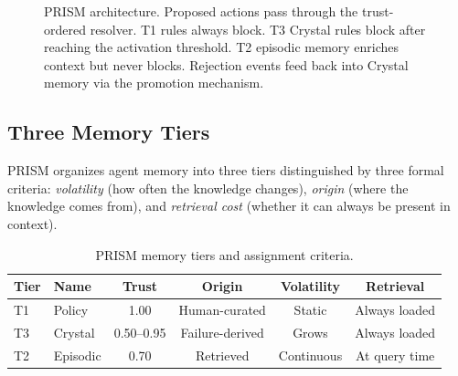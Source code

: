 \documentclass[11pt]{article}
\begin{document}
\begin{figure}[h]
\caption{PRISM architecture. Proposed actions pass through the trust-ordered resolver.
T1 rules always block. T3 Crystal rules block after reaching the activation threshold.
T2 episodic memory enriches context but never blocks.
Rejection events feed back into Crystal memory via the promotion mechanism.}
\label{fig:arch}
\end{figure}

\subsection{Three Memory Tiers}

PRISM organizes agent memory into three tiers distinguished by
three formal criteria: \emph{volatility} (how often the knowledge changes),
\emph{origin} (where the knowledge comes from),
and \emph{retrieval cost} (whether it can always be present in context).

\begin{table}[h]
\centering
\caption{PRISM memory tiers and assignment criteria.}
\label{tab:tiers}
\small
\begin{tabular}{@{}llcccc@{}}
\toprule
Tier & Name & Trust & Origin & Volatility & Retrieval \\
\midrule
T1 & Policy   & 1.00 & Human-curated & Static & Always loaded \\
T3 & Crystal  & 0.50--0.95 & Failure-derived & Grows & Always loaded \\
T2 & Episodic & 0.70 & Retrieved & Continuous & At query time \\
\bottomrule
\end{tabular}
\end{table}
\end{document}
